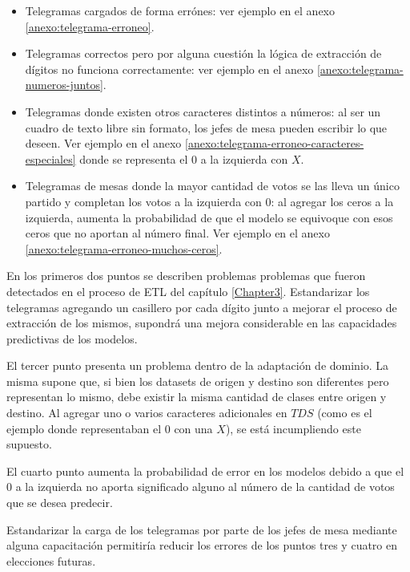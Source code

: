 \begin{itemize}
    \item Telegramas cargados de forma err\'ones: ver ejemplo en el anexo \ref{anexo:telegrama-erroneo}.
    \item Telegramas correctos pero por alguna cuesti\'on la l\'ogica de extracci\'on de d\'igitos no funciona correctamente: ver
          ejemplo en el anexo \ref{anexo:telegrama-numeros-juntos}.
    \item Telegramas donde existen otros caracteres distintos a n\'umeros: al ser un cuadro de texto libre sin formato, los jefes
          de mesa pueden escribir lo que deseen. Ver ejemplo en el anexo \ref{anexo:telegrama-erroneo-caracteres-especiales}
          donde se representa el $0$ a la izquierda con $X$.
    \item Telegramas de mesas donde la mayor cantidad de votos se las lleva un \'unico partido y completan los votos a la
          izquierda con $0$: al agregar los ceros a la izquierda, aumenta la probabilidad de que el modelo se equivoque con esos
          ceros que no aportan al n\'umero final. Ver ejemplo en el anexo \ref{anexo:telegrama-erroneo-muchos-ceros}.
\end{itemize}

En los primeros dos puntos se describen problemas problemas que fueron detectados en el proceso de ETL del cap\'itulo
\ref{Chapter3}. Estandarizar los telegramas agregando un casillero por cada d\'igito junto a mejorar el proceso de
extracci\'on de los mismos, supondr\'a una mejora considerable en las capacidades predictivas de los modelos.

El tercer punto presenta un problema dentro de la adaptaci\'on de dominio. La misma supone que, si bien los datasets de
origen y destino son diferentes pero representan lo mismo, debe existir la misma cantidad de clases entre origen y
destino. Al agregar uno o varios caracteres adicionales en $TDS$ (como es el ejemplo donde representaban el $0$ con una
$X$), se est\'a incumpliendo este supuesto.

El cuarto punto aumenta la probabilidad de error en los modelos debido a que el $0$ a la izquierda no aporta
significado alguno al n\'umero de la cantidad de votos que se desea predecir.

Estandarizar la carga de los telegramas por parte de los jefes de mesa mediante alguna capacitaci\'on permitir\'ia
reducir los errores de los puntos tres y cuatro en elecciones futuras.

